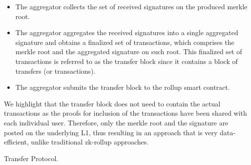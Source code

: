 \begin{Protocol*}[ht!]
\begin{mdframed}
\begin{itemize}
    \item The aggregator collects the set of received signatures on the produced merkle root.

    \item The aggregator aggregates the received signatures into a single aggregated signature and obtains a finalized set of transactions, which comprises the merkle root and the aggregated signature on such root. This finalized set of transactions is referred to as the transfer block since it contains a block of transfers (or transactions). 
    
    \item The aggregator submits the transfer block to the rollup smart contract. 
\end{itemize}

We highlight that the transfer block does not need to contain the actual transactions as the proofs for inclusion of the transactions have been shared with each individual user. Therefore, only the merkle root and the signature are posted on the underlying L1, thus resulting in an approach that is very data-efficient, unlike traditional zk-rollup approaches.

\end{mdframed}
\caption{Transfer Protocol.\label{alg:transfering}}
\end{Protocol*}